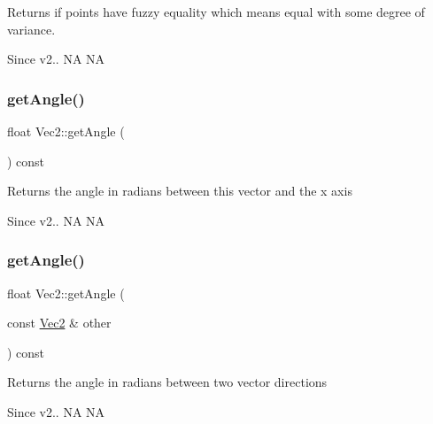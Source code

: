 \begin{DoxyReturn}{Returns}
if points have fuzzy equality which means equal with some degree of variance. 
\end{DoxyReturn}
\begin{DoxySince}{Since}
v2..  NA  NA 
\end{DoxySince}
\mbox{\label{classVec2_aaca24d4a0550be8892c4d84c7b37e027}} 
\subsubsection{\texorpdfstring{get\+Angle()}{getAngle()}\hspace{0.1cm}{\footnotesize\ttfamily [1/4]}}
{\footnotesize\ttfamily float Vec2\+::get\+Angle (\begin{DoxyParamCaption}{ }\end{DoxyParamCaption}) const\hspace{0.3cm}{\ttfamily [inline]}}

\begin{DoxyReturn}{Returns}
the angle in radians between this vector and the x axis 
\end{DoxyReturn}
\begin{DoxySince}{Since}
v2..  NA  NA 
\end{DoxySince}
\mbox{\label{classVec2_a94017db9e730f5935efa27aee1bf7df7}} 
\subsubsection{\texorpdfstring{get\+Angle()}{getAngle()}\hspace{0.1cm}{\footnotesize\ttfamily [2/4]}}
{\footnotesize\ttfamily float Vec2\+::get\+Angle (\begin{DoxyParamCaption}\item[{const \hyperlink{classVec2}{Vec2} \&}]{other }\end{DoxyParamCaption}) const}

\begin{DoxyReturn}{Returns}
the angle in radians between two vector directions 
\end{DoxyReturn}
\begin{DoxySince}{Since}
v2..  NA  NA 
\end{DoxySince}
\mbox{\label{classVec2_aaca24d4a0550be8892c4d84c7b37e027}} 
